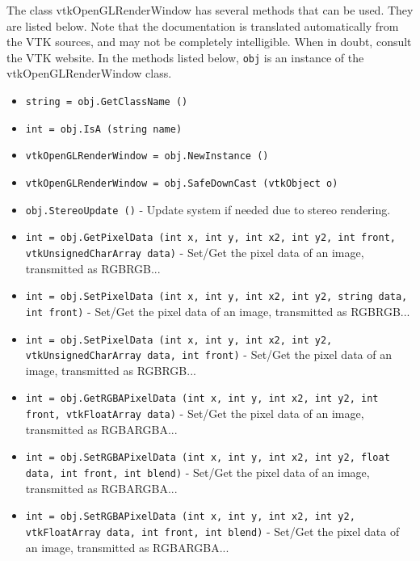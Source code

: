The class vtkOpenGLRenderWindow has several methods that can be used.
  They are listed below.
Note that the documentation is translated automatically from the VTK sources,
and may not be completely intelligible.  When in doubt, consult the VTK website.
In the methods listed below, \verb|obj| is an instance of the vtkOpenGLRenderWindow class.
\begin{itemize}
\item  \verb|string = obj.GetClassName ()|

\item  \verb|int = obj.IsA (string name)|

\item  \verb|vtkOpenGLRenderWindow = obj.NewInstance ()|

\item  \verb|vtkOpenGLRenderWindow = obj.SafeDownCast (vtkObject o)|

\item  \verb|obj.StereoUpdate ()| -  Update system if needed due to stereo rendering.

\item  \verb|int = obj.GetPixelData (int x, int y, int x2, int y2, int front, vtkUnsignedCharArray data)| -  Set/Get the pixel data of an image, transmitted as RGBRGB...

\item  \verb|int = obj.SetPixelData (int x, int y, int x2, int y2, string data, int front)| -  Set/Get the pixel data of an image, transmitted as RGBRGB...

\item  \verb|int = obj.SetPixelData (int x, int y, int x2, int y2, vtkUnsignedCharArray data, int front)| -  Set/Get the pixel data of an image, transmitted as RGBRGB...

\item  \verb|int = obj.GetRGBAPixelData (int x, int y, int x2, int y2, int front, vtkFloatArray data)| -  Set/Get the pixel data of an image, transmitted as RGBARGBA...

\item  \verb|int = obj.SetRGBAPixelData (int x, int y, int x2, int y2, float data, int front, int blend)| -  Set/Get the pixel data of an image, transmitted as RGBARGBA...

\item  \verb|int = obj.SetRGBAPixelData (int x, int y, int x2, int y2, vtkFloatArray data, int front, int blend)| -  Set/Get the pixel data of an image, transmitted as RGBARGBA...


\end{itemize}
